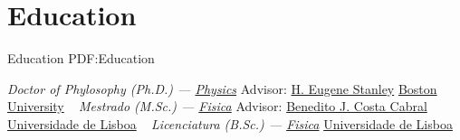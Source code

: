 \section
{Education}
{Education}
{PDF:Education}

\textit{Doctor of Phylosophy (Ph.D.) --- \href{http://physics.bu.edu/}{Physics}}
    \newline
    Advisor: \href{http://physics.bu.edu/people/show/68}{H. Eugene Stanley}
\newline
\href{http://www.bu.edu/}{Boston University}
\newline
~
\Gap
{}
\textit{Mestrado (M.Sc.) --- \href{https://ciencias.ulisboa.pt/en/physics}{Fisica}}
    \newline
    Advisor: \href{https://ciencias.ulisboa.pt/pt/perfil/bjcabral}{Benedito J. Costa Cabral}
\newline
\href{https://www.ulisboa.pt/}{Universidade de Lisboa}
\newline
~
\Gap
{}
\textit{Licenciatura (B.Sc.) --- \href{https://ciencias.ulisboa.pt/en/physics}{Fisica}}
\newline
\href{https://www.ulisboa.pt/}{Universidade de Lisboa}
\newline
~
\Gap
\vspace*{0.2cm}
